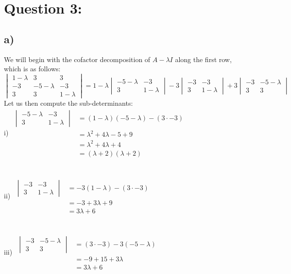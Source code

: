 \documentclass{article}
\begin{document}
\newpage
\section*{Question 3:}
\subsection*{a)}
We will begin with the cofactor decomposition of $A-\lambda I$ along the first row, which is as follows:
$$\begin{vmatrix}
1-\lambda & 3 & 3\\
-3 & -5-\lambda & -3\\
3 & 3& 1-\lambda
\end{vmatrix}=1-\lambda\begin{vmatrix}
-5-\lambda& -3\\
3 & 1-\lambda
\end{vmatrix}-3\begin{vmatrix}
-3 & -3 \\
3 & 1-\lambda
\end{vmatrix}+3\begin{vmatrix}
-3 & -5-\lambda \\
3 & 3
\end{vmatrix}$$
Let us then compute the sub-determinants:\\ 
i) $\begin{aligned}
    \begin{vmatrix}
        -5-\lambda& -3\\
        3 & 1-\lambda
        \end{vmatrix} &= (1-\lambda)(-5-\lambda)-(3\cdot -3)\\
        &=\lambda^{2}+4\lambda-5+9\\
        &=\lambda^{2}+4\lambda+4\\
        &=(\lambda+2)(\lambda+2)   
\end{aligned}$\\\\\\ii) $\begin{aligned}
    \begin{vmatrix}
        -3 & -3 \\
        3 & 1-\lambda
        \end{vmatrix} &= -3(1-\lambda)-(3\cdot -3)\\
        &= -3+3\lambda+9\\
        &=3\lambda+6
\end{aligned}$\\\\\\iii) $\begin{aligned}
    \begin{vmatrix}
        -3 & -5-\lambda \\
        3 & 3
        \end{vmatrix} &= (3\cdot -3)-3(-5-\lambda)\\
        &=-9+15+3\lambda\\
        &=3\lambda+6
\end{aligned}$\\\\
\end{document}

